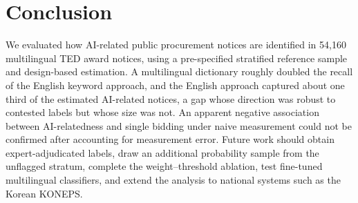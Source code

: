 \documentclass[runningheads]{llncs}
\begin{document}
\section{Conclusion}
We evaluated how AI-related public procurement notices are identified in 54,160 multilingual TED award notices, using a pre-specified stratified reference sample and design-based estimation. A multilingual dictionary roughly doubled the recall of the English keyword approach, and the English approach captured about one third of the estimated AI-related notices, a gap whose direction was robust to contested labels but whose size was not. An apparent negative association between AI-relatedness and single bidding under naive measurement could not be confirmed after accounting for measurement error. Future work should obtain expert-adjudicated labels, draw an additional probability sample from the unflagged stratum, complete the weight--threshold ablation, test fine-tuned multilingual classifiers, and extend the analysis to national systems such as the Korean KONEPS.
\end{document}
